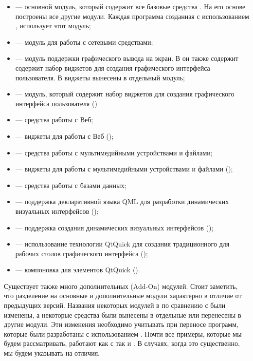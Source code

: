 \begin{itemize}
\item {} --- основной модуль, который содержит все базовые средства . На его основе
построены все другие модули. Каждая программа созданная с использованием , использует
этот модуль;
\item {} --- модуль для работы с сетевыми средствами;
\item {} --- модуль поддержки графического вывода на экран. В  он также содержит содержит
набор виджетов для создания графического интерфейса пользователя. В  виджеты вынесены в отдельный модуль;
\item {} --- модуль, который содержит набор виджетов для создания графического интерфейса
пользователя ()
\item {} --- средства работы с Веб;
\item {} --- виджеты для работы с Веб ();
\item {} --- средства работы с мультимедийными устройствами и файлами;
\item {} --- виджеты для работы с мультимедийными устройствами и файлами ();
\item {} --- средства работы с базами данных;
\item {} --- поддержка декларативной языка QML для разработки динамических визуальных
интерфейсов ();
\item {} --- поддержка создания динамических визуальных интерфейсов ();
\item {} --- использование технологии QtQuick для создания традиционного для рабочих
столов графического интерфейса ();
\item {} --- компоновка для элементов QtQuick ().
\end{itemize}

Существует также много дополнительных (Add-On) модулей. 
Стоит заметить, что разделение на основные и дополнительные
модули характерно  в отличие от предыдущих версий. Названия некоторых модулей в  по сравнению с 
были изменены, а некоторые средства были вынесены в
отдельные или перенесены в другие модули. Эти изменения необходимо учитывать при переносе программ, которые были
разработаны с использованием . Почти все примеры, которые мы будем рассматривать, работают как с  
так и . В случаях, когда это существенно, мы будем указывать на отличия.


